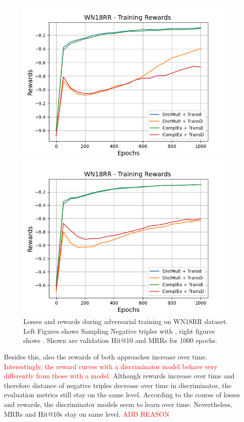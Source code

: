\begin{figure}
\begin{minipage}{.5\textwidth}
      \centering
      \includegraphics[width=0.9\linewidth]{figures/results/gan_train/not_pretrained/uncertainty/max/entropy/wn18rr/uncertainty_wn18rr_rew.png}
    \end{minipage}%
    \begin{minipage}{.5\textwidth}
      \centering
      \includegraphics[width=0.9\linewidth]{figures/results/gan_train/not_pretrained/uncertainty/max_distribution/entropy/wn18rr/uncertainty_wn18rr_rew.png}
    \end{minipage}%
    \caption{Losses and rewards during adversarial training on \textsc{WN18RR} dataset. 
    Left Figures shows Sampling Negative triples with \usmax, right figures shows \ussoftmax.
    Shown are validation Hit@10 and MRRs for 1000 epochs.}
    \label{fig:advtrain_wn18rr_usmax_ussoftmax_losses_rewards}
\end{figure}
Besides this, also the rewards of both approaches increase over time.
\textcolor{red}{Interestingly, the reward curves with a \transd discriminator model behave very differently from those with a \transe model.}
Although rewards increase over time and therefore distance of negative triples decrease over time in discriminator, the evaluation metrics still stay on the same level.
According to the course of losses and rewards, the discriminator models seem to learn over time.
Nevertheless, MRRs and Hit@10s stay on same level.
\textcolor{red}{ADD REASON}


